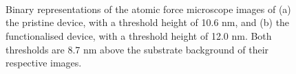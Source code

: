 \documentclass[
  a4paper,
]{scrbook}
\begin{document}
\begin{figure}
\begin{minipage}[t]{0.01\linewidth}
{~

}

\end{minipage}%
%
\begin{minipage}[t]{0.03\linewidth}

{\centering 


}

\end{minipage}%
%
\begin{minipage}[t]{0.01\linewidth}

{\centering 

~

}

\end{minipage}%
%
\begin{minipage}[t]{0.45\linewidth}

{\centering 


}

\end{minipage}%
%
\begin{minipage}[t]{0.01\linewidth}

{\centering 

~

}

\end{minipage}%

\caption{\label{fig-crosssection}Binary representations of the atomic
force microscope images of (a) the pristine device, with a threshold
height of 10.6 nm, and (b) the functionalised device, with a threshold
height of 12.0 nm. Both thresholds are 8.7 nm above the substrate
background of their respective images.}

\end{figure}
\end{document}
